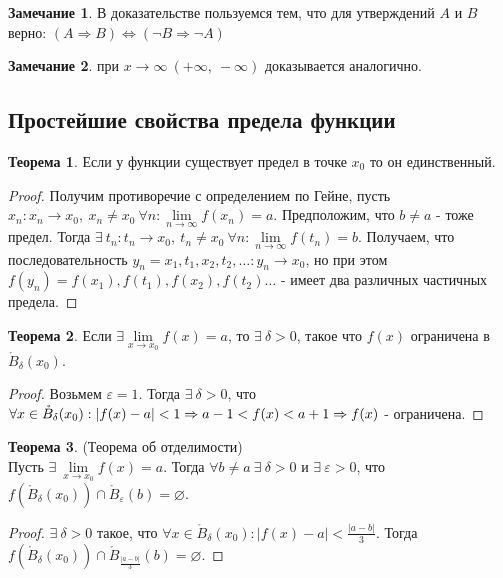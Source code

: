 \documentclass[a4paper, 12pt]{article}
\newcommand{\Bo}{\mathring{B}}
\renewcommand{\epsilon}{\varepsilon}
\renewcommand{\emptyset}{\varnothing}
\newcommand{\lims}{\lim\limits_{n\to \infty}}
\theoremstyle{definition}
\newtheorem*{theorem}{Теорема}
\newtheorem*{comm}{Замечание}
\begin{document}
        \begin{comm}
            В доказательстве пользуемся тем, что для утверждений $A$ и $B$ верно: $(A\Rightarrow B) \Leftrightarrow (\lnot B\Rightarrow \lnot A)$
        \end{comm} 
        \begin{comm}
            при $x\to \infty\ (+\infty,\ -\infty)$ доказывается аналогично.
        \end{comm}
    \subsection{Простейшие свойства предела функции}
        \begin{theorem}
            Если у функции существует предел в точке $x_0$ то он единственный.
        \end{theorem}
        \begin{proof}
            Получим противоречие с определением по Гейне, пусть $x_n: x_n\to x_0,\ x_n\ne x_0\ \forall n: \lims f(x_n)=a$. Предположим, что $b\ne a$ - тоже предел. Тогда $\exists\ t_n: t_n\to x_0,\ t_n\ne x_0\ \forall n: \lims f(t_n)=b$. Получаем, что последовательность $y_n = x_1,t_1,x_2,t_2,\dots: y_n\to x_0$, но при этом $f(y_n)= f(x_1),f(t_1),f(x_2),f(t_2)\dots$ - имеет два различных частичных предела.
        \end{proof}
        \begin{theorem}
            Если $\exists \lim\limits_{x\to x_0}f(x)=a$, то $\exists\ \delta>0$, такое что $f(x)$ ограничена в $\Bo_{\delta}(x_0)$.
        \end{theorem} 
        \begin{proof}
            Возьмем $\epsilon = 1$. Тогда $\exists\ \delta>0$, что $\forall x\in \Bo_{\delta}(x_0): |f(x)-a|<1\\
            \Rightarrow a-1<f(x)<a+1 \Rightarrow f(x)$ - ограничена.
        \end{proof}
        \begin{theorem} (Теорема об отделимости)\\
            Пусть $\exists\ \lim\limits_{x\to x_0}f(x)=a$. Тогда $\forall b\ne a\ \exists\ \delta>0$ и $\exists\ \epsilon>0$, что $f(\Bo_{\delta}(x_0))\cap \Bo_\epsilon(b)=\emptyset$. 
        \end{theorem}  
        \begin{proof}
            $\exists\ \delta>0$ такое, что $\forall x\in \Bo_{\delta}(x_0): |f(x)-a|<\frac{|a-b|}{3}$. Тогда\\
            $f(\Bo_{\delta}(x_0))\cap\Bo_{\frac{|a-b|}{3}}(b)=\emptyset$.
        \end{proof} 
\end{document}

